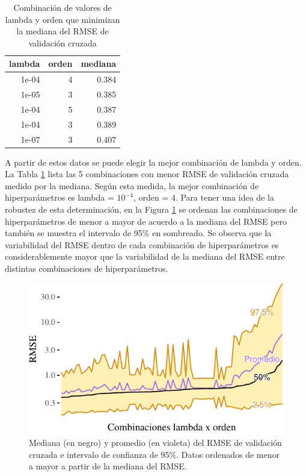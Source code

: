 \documentclass[]{tufte-handout}
\begin{document}
\begin{table}

\caption{\label{tab:rmse-mejores}Combinación de valores de lambda y orden que minimizan la mediana del RMSE de validación cruzada}
\centering
\begin{tabular}[t]{rrr}
\toprule
lambda & orden & mediana\\
\midrule
1e-04 & 4 & 0.384\\
1e-05 & 3 & 0.385\\
1e-04 & 5 & 0.387\\
1e-04 & 3 & 0.389\\
1e-07 & 3 & 0.407\\
\bottomrule
\end{tabular}
\end{table}

A partir de estos datos se puede elegir la mejor combinación de lambda y orden. La Tabla \ref{tab:rmse-mejores} lista las 5 combinaciones con menor RMSE de validación cruzada medido por la mediana. Según esta medida, la mejor combinación de hiperparámetros es lambda = \ensuremath{10^{-4}}, orden = 4. Para tener una idea de la robustez de esta determinación, en la Figura \ref{fig:rmse-orden} se ordenan las combinaciones de hiperparámetros de menor a mayor de acuerdo a la mediana del RMSE pero también se muestra el intervalo de 95\% en sombreado. Se observa que la variabilidad del RMSE dentro de cada combinación de hiperparámetros es considerablemente mayor que la variabilidad de la mediana del RMSE entre distintas combinaciones de hiperparámetros.

\begin{figure}
\includegraphics{README_files/figure-latex/rmse-orden-1} \caption[Mediana (en negro) y promedio (en violeta) del RMSE de validación cruzada e intervalo de confianza de 95\%]{Mediana (en negro) y promedio (en violeta) del RMSE de validación cruzada e intervalo de confianza de 95\%. Datos ordenados de menor a mayor a partir de la mediana del RMSE.}\label{fig:rmse-orden}
\end{figure}
\end{document}
